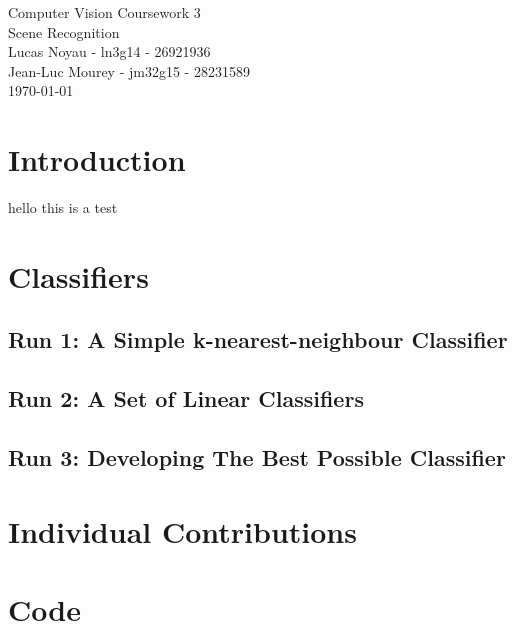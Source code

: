 \documentclass[12pt]{article}
\begin{document}
\begin{center}
{\Large Computer Vision Coursework 3} \\
{\Large Scene Recognition} \\
Lucas Noyau - ln3g14 - 26921936\\
Jean-Luc Mourey - jm32g15 - 28231589\\
\today
\end{center}


\section{Introduction}
hello this is a test

\section{Classifiers}

\subsection{Run 1: A Simple k-nearest-neighbour Classifier}

\subsection{Run 2: A Set of Linear Classifiers}

\subsection{Run 3: Developing The Best Possible Classifier}


\section{Individual Contributions}


\appendix
\section{Code}
\end{document}
